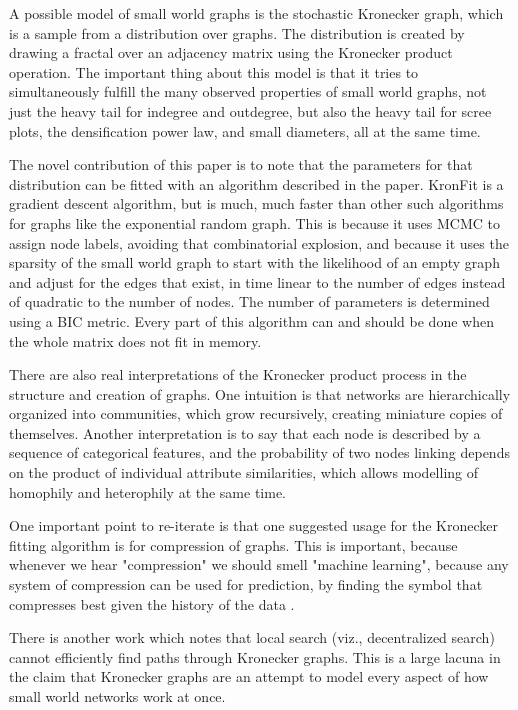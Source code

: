 \documentclass[12pt]{article}
\begin{document}
A possible model of small world graphs is the stochastic Kronecker graph\cite{kronfit}, which is a sample from a distribution over graphs. The distribution is created by drawing a fractal over an adjacency matrix using the Kronecker product operation. The important thing about this model is that it tries to simultaneously fulfill the many observed properties of small world graphs, not just the heavy tail for indegree and outdegree, but also the heavy tail for scree plots, the densification power law, and small diameters, all at the same time.

The novel contribution of this paper is to note that the parameters for that distribution can be fitted with an algorithm described in the paper. KronFit is a gradient descent algorithm, but is much, much faster than other such algorithms for graphs like the exponential random graph. This is because it uses MCMC to assign node labels, avoiding that combinatorial explosion, and because it uses the sparsity of the small world graph to start with the likelihood of an empty graph and adjust for the edges that exist, in time linear to the number of edges instead of quadratic to the number of nodes. The number of parameters is determined using a BIC metric. Every part of this algorithm can and should be done when the whole matrix does not fit in memory.

There are also real interpretations of the Kronecker product process in the structure and creation of graphs. One intuition is that networks are hierarchically organized into communities, which grow recursively, creating miniature copies of themselves. Another interpretation is to say that each node is described by a sequence of categorical features, and the probability of two nodes linking depends on the product of individual attribute similarities, which allows modelling of homophily and heterophily at the same time.

One important point to re-iterate is that one suggested usage for the Kronecker fitting algorithm is for compression of graphs. This is important, because whenever we hear "compression" we should smell "machine learning", because any system of compression can be used for prediction, by finding the symbol that compresses best given the history of the data \cite{mlcompression}.

There is another work which notes that local search (viz., decentralized search) cannot efficiently find paths through Kronecker graphs. This is a large lacuna in the claim that Kronecker graphs are an attempt to model every aspect of how small world networks work at once\cite{stochkrongraph}.
\end{document}
